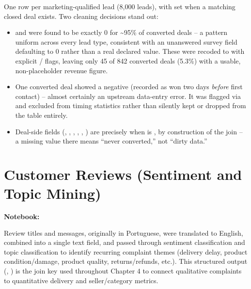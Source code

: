 \documentclass[11pt,a4paper]{report}
\begin{document}
One row per marketing-qualified lead (8{,}000 leads), with  set when a
matching closed deal exists. Two cleaning decisions stand out:
\begin{itemize}
    \item {} and  were
        found to be exactly 0 for \textasciitilde95\% of converted deals -- a pattern uniform
        across every lead type, consistent with an unanswered survey field defaulting to 0 rather
        than a real declared value. These were recoded to  with explicit
         /  flags, leaving only
        45 of 842 converted deals (5.3\%) with a usable, non-placeholder revenue figure.
    \item One converted deal showed a negative  (recorded as won two
        days \emph{before} first contact) -- almost certainly an upstream data-entry error. It was
        flagged via  and excluded from timing statistics rather
        than silently kept or dropped from the table entirely.
    \item Deal-side fields (, ,
        , , , ) are
         precisely when  is , by construction
        of the join -- a missing value there means ``never converted,'' not ``dirty data.''
\end{itemize}

\section{Customer Reviews (Sentiment and Topic Mining)}
\textbf{Notebook:} 

Review titles and messages, originally in Portuguese, were translated to English, combined into a
single text field, and passed through sentiment classification and topic classification to
identify recurring complaint themes (delivery delay, product condition/damage, product quality,
returns/refunds, etc.). This structured output (, ) is the
join key used throughout Chapter 4 to connect qualitative complaints to quantitative delivery and
seller/category metrics.

\clearpage

\end{document}
